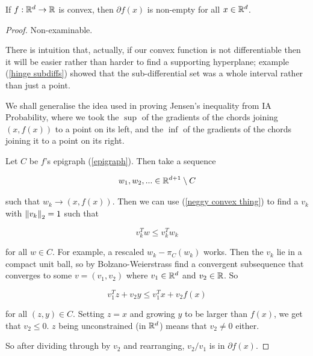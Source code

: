 \documentclass[11pt]{scrartcl}
\begin{document}
\begin{theorem}
If $f : \mathbb R^d \rightarrow \mathbb R$ is convex, then $\partial f(x)$ is non-empty for all $x \in \mathbb R^d$.
\begin{proof}
Non-examinable.

There is intuition that, actually, if our convex function is not differentiable then it will be easier rather than harder to find a supporting hyperplane; example (\ref{hinge subdiffs}) showed that the sub-differential set was a whole interval rather than just a point.

We shall generalise the idea used in proving Jensen's inequality from IA Probability, where we took the $\sup$ of the gradients of the chords joining $(x,f(x))$ to a point on its left, and the $\inf$ of the gradients of the chords joining it to a point on its right.

Let $C$ be $f$'s epigraph (\ref{epigraph}). Then take a sequence 

\begin{equation}
    w_1, w_2, ... \in \mathbb R^{d+1} \setminus C
\end{equation}

such that $w_k \rightarrow (x,f(x))$. Then we can use (\ref{neggy convex thing}) to find a $v_k$ with $\left\lVert v_k\right\rVert_2=1$ such that

\begin{equation}
    v_k^T w \le v_k^T w_k
\end{equation}

for all $w \in C$. For example, a rescaled $w_k - \pi_C(w_k)$ works. Then the $v_k$ lie in a compact unit ball, so by Bolzano-Weierstrass find a convergent subsequence that converges to some $v = (v_1, v_2)$ where $v_1 \in \mathbb R^d$ and $v_2 \in \mathbb R$. So

\begin{equation}
v_1^T z + v_2 y \le v_1^T x + v_2 f(x)    
\end{equation}

for all $(z,y) \in C$. Setting $z=x$ and growing $y$ to be larger than $f(x)$, we get that $v_2 \le 0$. $z$ being unconstrained (in $\mathbb R^d$) means that $v_2 \neq 0$ either.

So after dividing through by $v_2$ and rearranging, $v_2/v_1$ is in $\partial f(x)$.
\end{proof}
\end{theorem}
\end{document}
